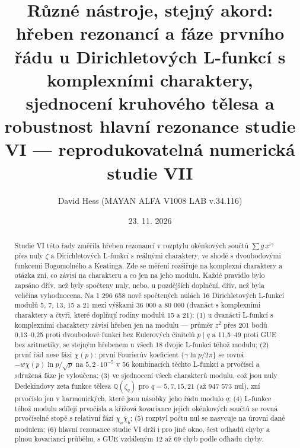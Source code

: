\documentclass[
  10pt,
]{article}
\title{Různé nástroje, stejný akord: hřeben rezonancí a fáze prvního
řádu u Dirichletových L-funkcí s komplexními charaktery, sjednocení
kruhového tělesa a robustnost hlavní rezonance studie VI ---
reprodukovatelná numerická studie VII}
\author{David Hess (MAYAN ALFA V1008 LAB v.34.116)}
\date{23. 11. 2026}
\begin{document}
\maketitle
\begin{abstract}
Studie VI této řady změřila hřeben rezonancí v rozptylu okénkových
součtů \(\sum g\,x^{i\gamma}\) přes nuly \(\zeta\) a Dirichletových
L-funkcí s reálnými charaktery, ve shodě s dvoubodovými funkcemi
Bogomolného a Keatinga. Zde se měření rozšiřuje na komplexní charaktery
a otázka zní, co závisí na charakteru a co jen na jeho modulu. Každé
pravidlo bylo zapsáno dřív, než byly spočteny nuly, nebo, u pozdějších
doplnění, dřív, než byla veličina vyhodnocena. Na 1 296 658 nově
spočtených nulách 16 Dirichletových L-funkcí modulů 5, 7, 13, 15 a 21
mezi výškami 36 000 a 80 000 (dvanáct s komplexními charaktery a čtyři,
které doplňují rodiny modulů 15 a 21): (1) u dvanácti L-funkcí s
komplexními charaktery závisí hřeben jen na modulu --- průměr \(z^2\)
přes 201 bodů 0,13--0,25 proti dvoubodové funkci bez Eulerových činitelů
\(p \mid q\) a 11,5--49 proti GUE bez aritmetiky, se stejným hřebenem u
všech 18 dvojic L-funkcí téhož modulu; (2) první řád nese fázi
\(\chi(p)\): první Fourierův koeficient \(\{\gamma\ln p/2\pi\}\) se
rovná \(-w\chi(p)\ln p/\sqrt p\) na \(5{,}2\cdot10^{-5}\) v 56
kombinacích těchto L-funkcí a prvočísel a sdružená fáze je vyloučena;
(3) ve sjednocení všech charakterů modulu, což jsou nuly Dedekindovy
zeta funkce tělesa \(\mathbb{Q}(\zeta_q)\) pro \(q = 5, 7, 15, 21\) (až
947 573 nul), zní prvočíslo jen v harmonických, které jsou násobky jeho
řádu modulo \(q\); (4) L-funkce téhož modulu sdílejí prvočísla a křížová
kovariance jejich okénkových součtů se rovná prvočíselné stopě s
relativní fází \(\chi_a\bar\chi_b\); (5) rozptyl počtu nul se nasycuje
na úrovni dané modulem; (6) hlavní rezonance studie VI drží i pro jiné
okno, šest odhadů chyby a plnou kovarianci průběhu, s GUE vzdáleným 12
až 69 chyb podle odhadu chyby.


\end{abstract}
\end{document}
